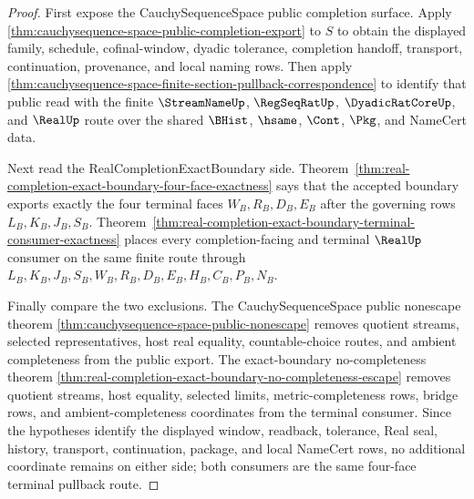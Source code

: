 \begin{proof}
First expose the CauchySequenceSpace public completion surface. Apply \autoref{thm:cauchysequence-space-public-completion-export} to $S$ to obtain the displayed family, schedule, cofinal-window, dyadic tolerance, completion handoff, transport, continuation, provenance, and local naming rows. Then apply \autoref{thm:cauchysequence-space-finite-section-pullback-correspondence} to identify that public read with the finite $\StreamNameUp$, $\RegSeqRatUp$, $\DyadicRatCoreUp$, and $\RealUp$ route over the shared $\BHist$, $\hsame$, $\Cont$, $\Pkg$, and NameCert data.

Next read the RealCompletionExactBoundary side. Theorem~\ref{thm:real-completion-exact-boundary-four-face-exactness} says that the accepted boundary exports exactly the four terminal faces $W_B,R_B,D_B,E_B$ after the governing rows $L_B,K_B,J_B,S_B$. Theorem~\ref{thm:real-completion-exact-boundary-terminal-consumer-exactness} places every completion-facing and terminal $\RealUp$ consumer on the same finite route through $L_B,K_B,J_B,S_B,W_B,R_B,D_B,E_B,H_B,C_B,P_B,N_B$.

Finally compare the two exclusions. The CauchySequenceSpace public nonescape theorem \autoref{thm:cauchysequence-space-public-nonescape} removes quotient streams, selected representatives, host real equality, countable-choice routes, and ambient completeness from the public export. The exact-boundary no-completeness theorem \autoref{thm:real-completion-exact-boundary-no-completeness-escape} removes quotient streams, host equality, selected limits, metric-completeness rows, bridge rows, and ambient-completeness coordinates from the terminal consumer. Since the hypotheses identify the displayed window, readback, tolerance, Real seal, history, transport, continuation, package, and local NameCert rows, no additional coordinate remains on either side; both consumers are the same four-face terminal pullback route.
\end{proof}

